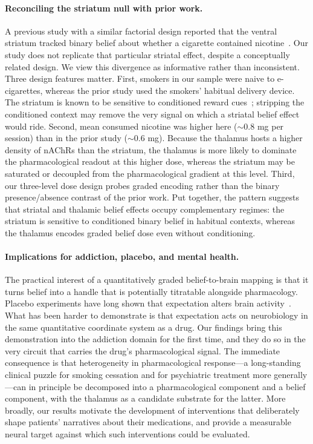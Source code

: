 \documentclass[11pt]{article}
\begin{document}
\paragraph{Reconciling the striatum null with prior work.} A previous study with a similar factorial design reported that the ventral striatum tracked binary belief about whether a cigarette contained nicotine~\cite{gu2015belief}. Our study does not replicate that particular striatal effect, despite a conceptually related design. We view this divergence as informative rather than inconsistent. Three design features matter. First, smokers in our sample were naive to e-cigarettes, whereas the prior study used the smokers' habitual delivery device. The striatum is known to be sensitive to conditioned reward cues~\cite{haber2010reward,kober2010brain}; stripping the conditioned context may remove the very signal on which a striatal belief effect would ride. Second, mean consumed nicotine was higher here ($\sim0.8$ mg per session) than in the prior study ($\sim0.6$ mg). Because the thalamus hosts a higher density of nAChRs than the striatum, the thalamus is more likely to dominate the pharmacological readout at this higher dose, whereas the striatum may be saturated or decoupled from the pharmacological gradient at this level. Third, our three-level dose design probes graded encoding rather than the binary presence/absence contrast of the prior work. Put together, the pattern suggests that striatal and thalamic belief effects occupy complementary regimes: the striatum is sensitive to conditioned binary belief in habitual contexts, whereas the thalamus encodes graded belief dose even without conditioning.

\paragraph{Implications for addiction, placebo, and mental health.} The practical interest of a quantitatively graded belief-to-brain mapping is that it turns belief into a handle that is potentially titratable alongside pharmacology. Placebo experiments have long shown that expectation alters brain activity~\cite{wager2004placebo,benedetti2013placebo}. What has been harder to demonstrate is that expectation acts on neurobiology in the same quantitative coordinate system as a drug. Our findings bring this demonstration into the addiction domain for the first time, and they do so in the very circuit that carries the drug's pharmacological signal. The immediate consequence is that heterogeneity in pharmacological response---a long-standing clinical puzzle for smoking cessation and for psychiatric treatment more generally---can in principle be decomposed into a pharmacological component and a belief component, with the thalamus as a candidate substrate for the latter. More broadly, our results motivate the development of interventions that deliberately shape patients' narratives about their medications, and provide a measurable neural target against which such interventions could be evaluated.
\end{document}
